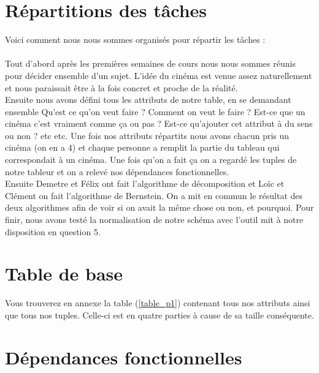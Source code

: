 \documentclass[a4paper,sffamily,12pt]{article}
\begin{document}
	\section{Répartitions des tâches}

		\vspace{0.5cm}

		\noindent Voici comment nous nous sommes organisés pour répartir les tâches : \\
		\\
		\indent Tout d'abord après les premières semaines de cours nous nous sommes réunis pour décider ensemble d'un sujet. L'idée du cinéma est venue assez naturellement et nous paraissait être à la fois concret et proche de la réalité.\\
		\indent Ensuite nous avons défini tous les attributs de notre table, en se demandant ensemble Qu'est ce qu'on veut faire ? Comment on veut le faire ? Est-ce que un cinéma c'est vraiment comme ça ou pas ? Est-ce qu'ajouter cet attribut à du sens ou non ? etc etc. Une fois nos attributs répartits nous avons chacun pris un cinéma (on en a 4) et chaque personne a remplit la partie du tableau qui correspondait à un cinéma. Une fois qu'on a fait ça on a regardé les tuples de notre tableur et on a relevé nos dépendances fonctionnelles.\\
		\indent Ensuite Demetre et Félix ont fait l'algorithme de décomposition et Loïc et Clément on fait l'algorithme de Bernstein. On a mit en commun le résultat des deux algorithmes afin de voir si on avait la même chose ou non, et pourquoi. Pour finir, nous avons testé la normalisation de notre schéma avec l'outil mit à notre disposition en question 5.
						
		\vspace{0.5cm}
		
	\section{Table de base}	
		
		\vspace{0.5cm}
			
		Vous trouverez en annexe la table (\ref{table_p1}) contenant tous nos attributs ainsi que tous nos tuples. Celle-ci est en quatre parties à cause de sa taille conséquente.
		
		\vspace{0.5cm}						

	\section{Dépendances fonctionnelles}
	
\end{document}
